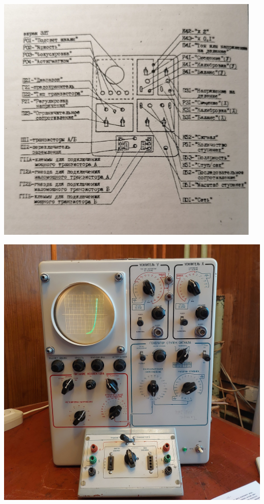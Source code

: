 \documentclass[a4paper, 12pt]{article}
\begin{document}
\begin{minipage}[H]{.5\linewidth}
    \includegraphics[width = 1\linewidth]{PNCHT_theor.png}
\end{minipage}
\begin{minipage}[H]{.5\linewidth}
    \includegraphics[width = 1\linewidth]{PNCHT_real.jpg}
\end{minipage}
\end{document}
